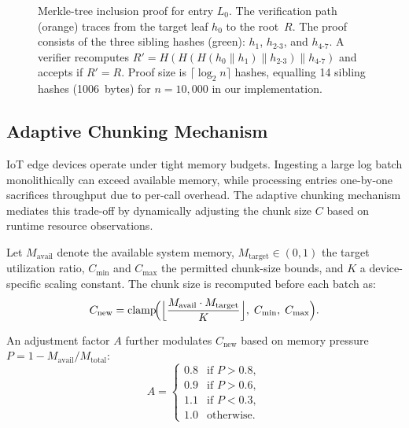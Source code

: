 \documentclass[preprint,12pt]{elsarticle}
\begin{document}
\begin{figure}[t]
{
}%
\caption{Merkle-tree inclusion proof for entry $L_0$.
The verification path (orange) traces from the target leaf $h_0$ to the root~$R$.
The proof consists of the three sibling hashes (green): $h_1$, $h_{2\text{-}3}$, and $h_{4\text{-}7}$.
A verifier recomputes $R' = H(H(H(h_0 \| h_1) \| h_{2\text{-}3}) \| h_{4\text{-}7})$ and accepts if $R' = R$.
Proof size is $\lceil \log_2 n \rceil$ hashes, equalling 14 sibling hashes (\SI{1006}{bytes}) for $n = 10{,}000$ in our implementation.}
\label{fig:merkle_proof}
\end{figure}


\subsection{Adaptive Chunking Mechanism}
\label{sec:chunking}

IoT edge devices operate under tight memory budgets.
Ingesting a large log batch monolithically can exceed available memory, while processing entries one-by-one sacrifices throughput due to per-call overhead.
The adaptive chunking mechanism mediates this trade-off by dynamically adjusting the chunk size $C$ based on runtime resource observations.

Let $M_{\text{avail}}$ denote the available system memory, $M_{\text{target}} \in (0,1)$ the target utilization ratio, $C_{\min}$ and $C_{\max}$ the permitted chunk-size bounds, and $K$ a device-specific scaling constant.
The chunk size is recomputed before each batch as:
\begin{equation}
  C_{\text{new}} = \mathrm{clamp}\!\Bigl(
    \Bigl\lfloor \frac{M_{\text{avail}} \cdot M_{\text{target}}}{K} \Bigr\rfloor,\;
    C_{\min},\; C_{\max}
  \Bigr).
  \label{eq:chunk}
\end{equation}

An adjustment factor $A$ further modulates $C_{\text{new}}$ based on memory pressure $P = 1 - M_{\text{avail}} / M_{\text{total}}$:
\begin{equation}
  A =
  \begin{cases}
    0.8 & \text{if } P > 0.8, \\
    0.9 & \text{if } P > 0.6, \\
    1.1 & \text{if } P < 0.3, \\
    1.0 & \text{otherwise}.
  \end{cases}
  \label{eq:adjust}
\end{equation}
\end{document}
